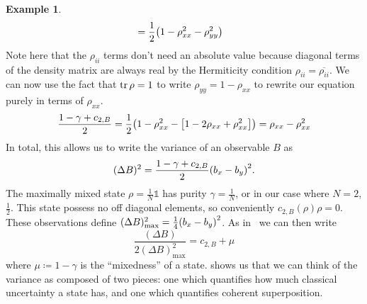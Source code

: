 \documentclass[11pt]{article}
\theoremstyle{definition}
\newtheorem{example}{Example}[section]
\newcommand{\twonorm}[1][\rho]{c_{2,B} (#1)}
\newcommand{\twonormE}[1][\rho]{c_{2,B}}
\begin{document}
\begin{example}
\begin{align*}
		                                 & = \frac{1}{2}\qty(1 - \rho_{xx}^2 - \rho_{yy}^2)
	\end{align*}
	Note here that the $\rho_{ii}$ terms don't need an absolute value because diagonal terms of the density matrix are always real by the Hermiticity condition $\rho_{ii} = \overline{\rho_{ii}}$.
	We can now use the fact that $\tr\rho = 1$ to write $\rho_{yy} = 1 - \rho_{xx}$ to rewrite our equation purely in terms of $\rho_{xx}$.
	\begin{equation*}
		\frac{1 - \gamma + \twonormE}{2} =\frac{1}{2}\qty(1 - \rho_{xx}^2 - \qty[1 - 2\rho_{xx} + \rho_{xx}^2]) = \rho_{xx} - \rho_{xx}^2
	\end{equation*}
	In total, this allows us to write the variance of an observable $B$ as
	\begin{equation*}
		(\Delta B)^2 = \frac{1 - \gamma + \twonormE}{2}\qty(b_x - b_y)^2.
	\end{equation*}
	The maximally mixed state $\rho = \frac{1}{N}\mathbb{1}$ has purity $\gamma = \frac{1}{N}$, or in our case where $N = 2$, $\frac{1}{2}$. This state possess no off diagonal elements, so conveniently $\twonorm{\rho} = 0$. These observations define $(\Delta B)_\text{max}^2 = \frac{1}{4}\qty(b_x - b_y)^2$. As in~\cite{dynamic-entropies} we can then write
	\begin{equation}\label{eq:variance-max}
		\frac{(\Delta B)}{2(\Delta B)_\text{max}^2} = \twonormE + \mu
	\end{equation}
	where $\mu\coloneqq 1 - \gamma$ is the ``mixedness'' of a state.  shows us that we can think of the variance as composed of two pieces: one which quantifies how much classical uncertainty a state has, and one which quantifies coherent superposition.
\end{example}
\end{document}
